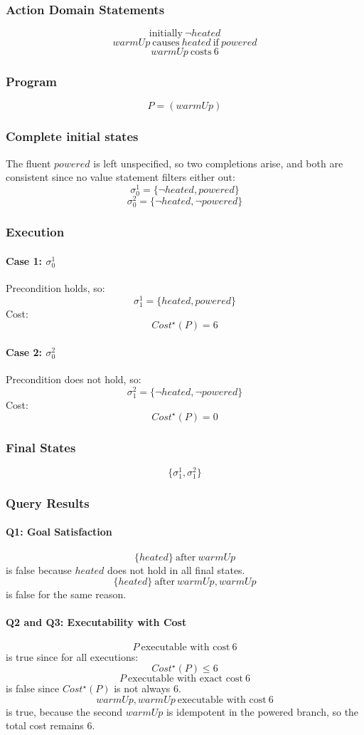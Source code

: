 \documentclass[11pt]{article}
\begin{document}
\subsubsection*{Action Domain Statements}
\[
\text{initially}~ \neg heated
\]
\[
warmUp ~\text{causes}~ heated ~\text{if}~ powered
\]
\[
warmUp ~\text{costs}~ 6
\]
\subsubsection*{Program}
\[
P = (warmUp)
\]
\subsubsection*{Complete initial states}
The fluent $powered$ is left unspecified, so two completions arise, and both are consistent since no value statement filters either out:
\[
\sigma_0^1 = \{\neg heated, powered\}
\]
\[
\sigma_0^2 = \{\neg heated, \neg powered\}
\]
\subsubsection*{Execution}
\paragraph{Case 1: $\sigma_0^1$}
Precondition holds, so:
\[
\sigma_1^1 = \{heated, powered\}
\]
Cost:
\[
Cost^\star(P) = 6
\]
\paragraph{Case 2: $\sigma_0^2$}
Precondition does not hold, so:
\[
\sigma_1^2 = \{\neg heated, \neg powered\}
\]
Cost:
\[
Cost^\star(P) = 0
\]
\subsubsection*{Final States}
\[
\{\sigma_1^1, \sigma_1^2\}
\]
\subsubsection*{Query Results}
\paragraph{Q1: Goal Satisfaction}
\[
\{heated\} ~\text{after}~ warmUp
\]
is false because $heated$ does not hold in all final states.
\[
\{heated\} ~\text{after}~ warmUp, warmUp
\]
is false for the same reason.
\paragraph{Q2 and Q3: Executability with Cost}
\[
P ~\text{executable with cost}~ 6
\]
is true since for all executions:
\[
Cost^\star(P) \leq 6
\]
\[
P ~\text{executable with exact cost}~ 6
\]
is false since $Cost^\star(P)$ is not always 6.
\[
warmUp, warmUp ~\text{executable with cost}~ 6
\]
is true, because the second $warmUp$ is idempotent in the powered branch, so the total cost remains 6.
\end{document}
